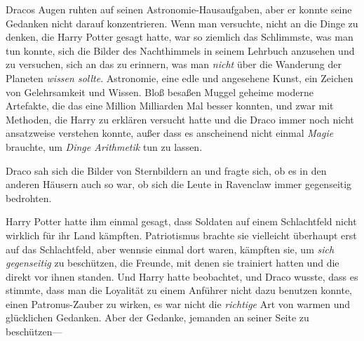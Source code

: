 Dracos Augen ruhten auf seinen Astronomie-Hausaufgaben, aber er konnte seine Gedanken nicht darauf konzentrieren. Wenn man versuchte, nicht an die Dinge zu denken, die Harry Potter gesagt hatte, war so ziemlich das Schlimmste, was man tun konnte, sich die Bilder des Nachthimmels in seinem Lehrbuch anzusehen und zu versuchen, sich an das zu erinnern, was man \emph{nicht} über die Wanderung der Planeten \emph{wissen sollte}. Astronomie, eine edle und angesehene Kunst, ein Zeichen von Gelehrsamkeit und Wissen. Bloß besaßen Muggel geheime moderne Artefakte, die das eine Million Milliarden Mal besser konnten, und zwar mit Methoden, die Harry zu erklären versucht hatte und die Draco immer noch nicht ansatzweise verstehen konnte, außer dass es anscheinend nicht einmal \emph{Magie} brauchte, um \emph{Dinge Arithmetik} tun zu lassen.

Draco sah sich die Bilder von Sternbildern an und fragte sich, ob es in den anderen Häusern auch so war, ob sich die Leute in Ravenclaw immer gegenseitig bedrohten.

Harry Potter hatte ihm einmal gesagt, dass Soldaten auf einem Schlachtfeld nicht wirklich für ihr Land kämpften. Patriotismus brachte sie vielleicht überhaupt erst auf das Schlachtfeld, aber wennsie einmal dort waren, kämpften sie, um \emph{sich gegenseitig} zu beschützen, die Freunde, mit denen sie trainiert hatten und die direkt vor ihnen standen. Und Harry hatte beobachtet, und Draco wusste, dass es stimmte, dass man die Loyalität zu einem Anführer nicht dazu benutzen konnte, einen Patronus-Zauber zu wirken, es war nicht die \emph{richtige} Art von warmen und glücklichen Gedanken. Aber der Gedanke, jemanden an seiner Seite zu beschützen—

